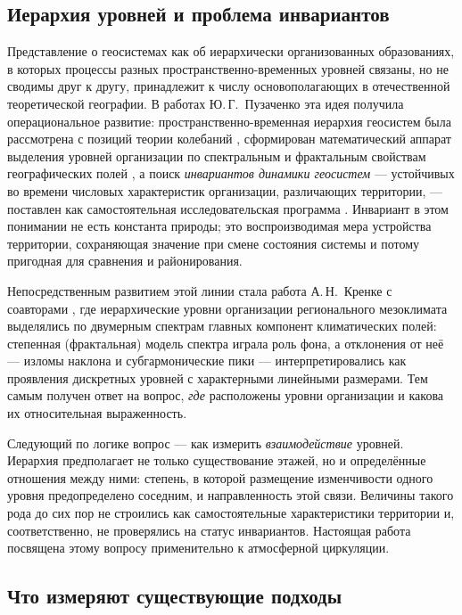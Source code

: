 \documentclass[11pt,a4paper]{article}
\begin{document}
\subsection{Иерархия уровней и проблема инвариантов}

Представление о геосистемах как об иерархически организованных образованиях, в которых процессы разных пространственно-временных уровней связаны, но не сводимы друг к другу, принадлежит к числу основополагающих в отечественной теоретической географии. В работах Ю.\,Г.~Пузаченко эта идея получила операциональное развитие: пространственно-временная иерархия геосистем была рассмотрена с позиций теории колебаний \cite{Puzachenko1986}, сформирован математический аппарат выделения уровней организации по спектральным и фрактальным свойствам географических полей \cite{Puzachenko2004}, а поиск \emph{инвариантов динамики геосистем} --- устойчивых во времени числовых характеристик организации, различающих территории, --- поставлен как самостоятельная исследовательская программа \cite{Puzachenko2010}. Инвариант в этом понимании не есть константа природы; это воспроизводимая мера устройства территории, сохраняющая значение при смене состояния системы и потому пригодная для сравнения и районирования.

Непосредственным развитием этой линии стала работа А.\,Н.~Кренке с соавторами \cite{Krenke2019}, где иерархические уровни организации регионального мезоклимата выделялись по двумерным спектрам главных компонент климатических полей: степенная (фрактальная) модель спектра играла роль фона, а отклонения от неё --- изломы наклона и субгармонические пики --- интерпретировались как проявления дискретных уровней с характерными линейными размерами. Тем самым получен ответ на вопрос, \emph{где} расположены уровни организации и какова их относительная выраженность.

Следующий по логике вопрос --- как измерить \emph{взаимодействие} уровней. Иерархия предполагает не только существование этажей, но и определённые отношения между ними: степень, в которой размещение изменчивости одного уровня предопределено соседним, и направленность этой связи. Величины такого рода до сих пор не строились как самостоятельные характеристики территории и, соответственно, не проверялись на статус инвариантов. Настоящая работа посвящена этому вопросу применительно к атмосферной циркуляции.

\subsection{Что измеряют существующие подходы}
\end{document}
